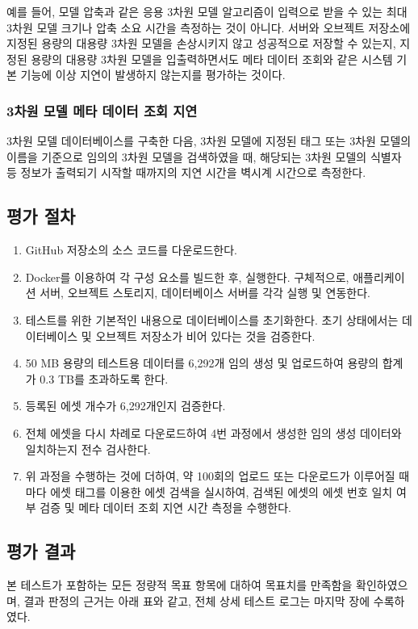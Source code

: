 \documentclass[11pt,oneside,openany,itemph,a4paper,chapter]{oblivoir}
\begin{document}
예를 들어, 모델 압축과 같은 응용 3차원 모델 알고리즘이 입력으로 받을 수 있는 최대 3차원 모델 크기나 압축 소요 시간을 측정하는 것이 아니다. 서버와 오브젝트 저장소에 지정된 용량의 대용량 3차원 모델을 손상시키지 않고 성공적으로 저장할 수 있는지, 지정된 용량의 대용량 3차원 모델을 입출력하면서도 메타 데이터 조회와 같은 시스템 기본 기능에 이상 지연이 발생하지 않는지를 평가하는 것이다.

\subsubsection{3차원 모델 메타 데이터 조회 지연}
3차원 모델 데이터베이스를 구축한 다음, 3차원 모델에 지정된 태그 또는 3차원 모델의 이름을 기준으로 임의의 3차원 모델을 검색하였을 때, 해당되는 3차원 모델의 식별자 등 정보가 출력되기 시작할 때까지의 지연 시간을 벽시계 시간으로 측정한다.

\subsection{평가 절차}
\begin{enumerate}
    \item GitHub 저장소의 소스 코드를 다운로드한다.
    \item Docker를 이용하여 각 구성 요소를 빌드한 후, 실행한다. 구체적으로, 애플리케이션 서버, 오브젝트 스토리지, 데이터베이스 서버를 각각 실행 및 연동한다.
    \item 테스트를 위한 기본적인 내용으로 데이터베이스를 초기화한다. 초기 상태에서는 데이터베이스 및 오브젝트 저장소가 비어 있다는 것을 검증한다.
    \item 50 MB 용량의 테스트용 데이터를 6,292개 임의 생성 및 업로드하여 용량의 합계가 0.3 TB를 초과하도록 한다.
    \item 등록된 에셋 개수가 6,292개인지 검증한다.
    \item 전체 에셋을 다시 차례로 다운로드하여 4번 과정에서 생성한 임의 생성 데이터와 일치하는지 전수 검사한다.
    \item 위 과정을 수행하는 것에 더하여, 약 100회의 업로드 또는 다운로드가 이루어질 때마다 에셋 태그를 이용한 에셋 검색을 실시하여, 검색된 에셋의 에셋 번호 일치 여부 검증 및 메타 데이터 조회 지연 시간 측정을 수행한다.
\end{enumerate}

\subsection{평가 결과}
본 테스트가 포함하는 모든 정량적 목표 항목에 대하여 목표치를 만족함을 확인하였으며, 결과 판정의 근거는 아래 표와 같고, 전체 상세 테스트 로그는 마지막 장에 수록하였다.
\end{document}

